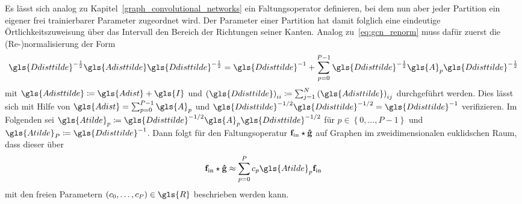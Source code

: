 Es lässt sich analog zu Kapitel~\ref{graph_convolutional_networks} ein Faltungsoperator definieren, bei dem nun aber jeder Partition ein eigener frei trainierbarer Parameter zugeordnet wird.
Der Parameter einer Partition hat damit folglich eine eindeutige Örtlichkeitszuweisung über das Intervall \bzw{} den Bereich der Richtungen seiner Kanten.
Analog zu~\eqref{eq:gcn_renorm} muss dafür zuerst die (Re-)normalisierung der Form
\begin{equation*}
  \gls{Ddisttilde}^{-\frac{1}{2}}\gls{Adisttilde}\gls{Ddisttilde}^{-\frac{1}{2}} = \gls{Ddisttilde}^{-1} + \sum_{p=0}^{P-1} \gls{Ddisttilde}^{-\frac{1}{2}}\gls{A}_p\gls{Ddisttilde}^{-\frac{1}{2}}
\end{equation*}
mit $\gls{Adisttilde} \coloneqq \gls{Adist} + \gls{I}$ und ${\left(\gls{Ddisttilde}\right)}_{ii} \coloneqq \sum_{j=1}^N {\left(\gls{Adisttilde}\right)}_{ij}$ durchgeführt werden.
Dies lässt sich mit Hilfe von $\gls{Adist} = \sum_{p=0}^{P-1} \gls{A}_p$ und $\gls{Ddisttilde}^{-1/2}\gls{Ddisttilde}^{-1/2} = \gls{Ddisttilde}^{-1}$ verifizieren.
Im Folgenden sei $\gls{Atilde}_p \coloneqq \gls{Ddisttilde}^{-1/2}\gls{A}_p\gls{Ddisttilde}^{-1/2}$ für $p \in \left\{0, \ldots, P-1 \right\}$ und $\gls{Atilde}_P \coloneqq \gls{Ddisttilde}^{-1}$.
Dann folgt für den Faltungsoperatur $\mathbf{f}_{\mathrm{in}} \star \mathbf{\hat g}$ auf Graphen im zweidimensionalen euklidschen Raum, dass dieser über
\begin{equation}
  \ve{f}_{\mathrm{in}} \star \ve{\hat g} \approx \sum_{p=0}^P c_p \gls{Atilde}_p \ve{f}_{\mathrm{in}}
  \label{eq:partitionierung_faltung}
\end{equation}
mit den freien Parametern $\left(c_0, \ldots, c_P\right) \in \gls{R}$ beschrieben werden kann.

